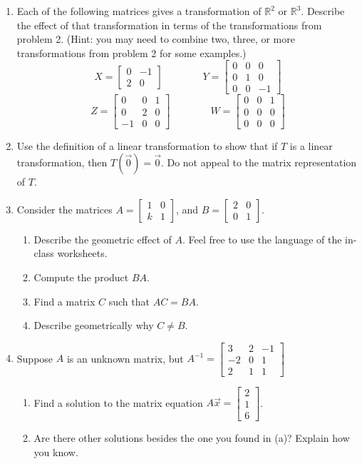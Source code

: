 \documentclass[letter]{article}
\newcommand{\R}{\mathbb{R}}
\newcommand{\mat}[1]{\begin{bmatrix}#1\end{bmatrix}}
\begin{document}
\begin{enumerate}
		
		\item Each of the following matrices gives a transformation of $\R^2$ or $\R^3$.  
			Describe the effect of that transformation in terms of the transformations from problem 2.
			(Hint: you may need to combine two, three, or more transformations from problem 2 for some
			examples.)
			\[
				X=\mat{0 & -1 \\ 2 & 0}
				\qquad \qquad
				Y=\mat{0 & 0 & 0\\ 0 & 1 & 0 \\ 0 & 0 & -1}
			\]
			\[
				Z=\mat{0 & 0 & 1 \\ 0 & 2 & 0 \\ -1 & 0 & 0}
				\qquad\qquad
				W=\mat{0 & 0 & 1 \\ 0 & 0 & 0 \\ 0 & 0 & 0}
			\]

		
		\item Use the definition of a linear transformation
			to show that if $T$ is a linear transformation, then $T(\vec{0}) = \vec{0}$.  
			Do not appeal to the matrix representation of $T$.
	
		
		\item Consider the matrices $A = \mat{1 & 0 \\ k & 1}$, and $B = \mat{2 & 0 \\ 0 & 1}$.
		
		\begin{enumerate}
			\item Describe the geometric effect of $A$.  Feel free to use the language of the in-class worksheets.
			\item Compute the product $BA$.
			\item Find a matrix $C$ such that $AC = BA$.
			\item Describe geometrically why $C \neq B$.
		\end{enumerate}
		
		\item Suppose $A$ is an unknown matrix, but $A^{-1} = \mat{3 & 2 & -1 \\ -2 & 0 & 1 \\ 2 & 1 & 1}$
		
		\begin{enumerate}
			\item Find a solution to the matrix equation $A \vec{x} = \mat{2 \\ 1 \\ 6}$.
			\item Are there other solutions besides the one you found in (a)?  Explain how you know.
		\end{enumerate}
		
		
		
		
	\end{enumerate}
\end{document}
